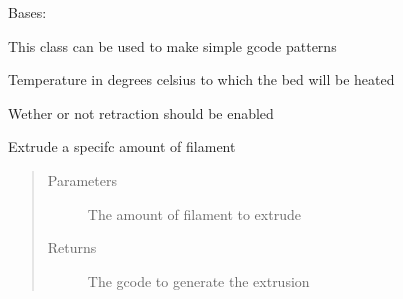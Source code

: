 \documentclass[letterpaper,10pt,english]{sphinxmanual}
\begin{document}
\begin{fulllineitems}
\label{\detokenize{index:generator.generator}}
\sphinxAtStartPar
Bases: 

\sphinxAtStartPar
This class can be used to make simple gcode patterns

\begin{fulllineitems}
\label{\detokenize{index:generator.generator.bed_temp}}
\sphinxAtStartPar
Temperature in degrees celsius to which the bed will be heated

\end{fulllineitems}


\begin{fulllineitems}
\label{\detokenize{index:generator.generator.enable_retraction}}
\sphinxAtStartPar
Wether or not retraction should be enabled

\end{fulllineitems}


\begin{fulllineitems}
\label{\detokenize{index:generator.generator.extrude}}
\sphinxAtStartPar
Extrude a specifc amount of filament
\begin{quote}\begin{description}
\item[{Parameters}] \leavevmode
\sphinxAtStartPar
{} \textendash{} The amount of filament to extrude

\item[{Returns}] \leavevmode
\sphinxAtStartPar
The gcode to generate the extrusion


\end{description}
\end{quote}
\end{fulllineitems}
\end{fulllineitems}
\end{document}
